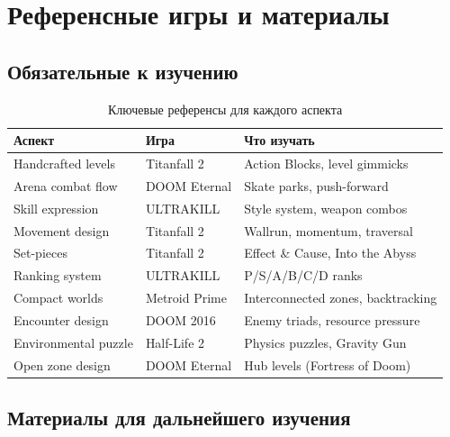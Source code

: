 \documentclass[a4paper,11pt]{report}
\begin{document}
\chapter{Референсные игры и материалы}

\section{Обязательные к изучению}

\begin{table}[H]
\centering
\caption{Ключевые референсы для каждого аспекта}
\begin{tabularx}{\textwidth}{@{}lXX@{}}
\toprule
\textbf{Аспект} & \textbf{Игра} & \textbf{Что изучать} \\
\midrule
Handcrafted levels & Titanfall 2 & Action Blocks, level gimmicks \\
Arena combat flow & DOOM Eternal & Skate parks, push-forward \\
Skill expression & ULTRAKILL & Style system, weapon combos \\
Movement design & Titanfall 2 & Wallrun, momentum, traversal \\
Set-pieces & Titanfall 2 & Effect \& Cause, Into the Abyss \\
Ranking system & ULTRAKILL & P/S/A/B/C/D ranks \\
Compact worlds & Metroid Prime & Interconnected zones, backtracking \\
Encounter design & DOOM 2016 & Enemy triads, resource pressure \\
Environmental puzzle & Half-Life 2 & Physics puzzles, Gravity Gun \\
Open zone design & DOOM Eternal & Hub levels (Fortress of Doom) \\
\bottomrule
\end{tabularx}
\end{table}

\section{Материалы для дальнейшего изучения}
\end{document}

